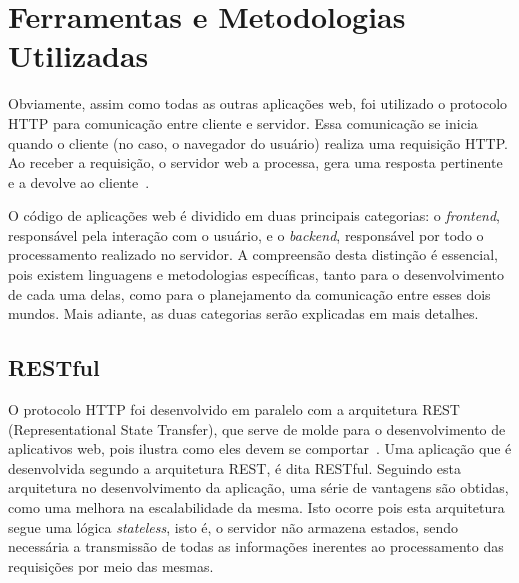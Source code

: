 \chapter{Ferramentas e Metodologias Utilizadas}

Obviamente, assim como todas as outras aplicações web, foi utilizado o protocolo HTTP para comunicação entre cliente e servidor. Essa comunicação se inicia quando o cliente (no caso, o navegador do usuário) realiza uma requisição HTTP. Ao receber a requisição, o servidor web a processa, gera uma resposta pertinente e a devolve ao cliente~\cite{wikipediahttp}.

O código de aplicações web é dividido em duas principais categorias: o \textit{frontend}, responsável pela interação com o usuário, e o \textit{backend}, responsável por todo o processamento realizado no servidor. A compreensão desta distinção é essencial, pois existem linguagens e metodologias específicas, tanto para o desenvolvimento de cada uma delas, como para o planejamento da comunicação entre esses dois mundos. Mais adiante, as duas categorias serão explicadas em mais detalhes.

\section{RESTful}

O protocolo HTTP foi desenvolvido em paralelo com a arquitetura REST (Representational State Transfer),
que serve de molde para o desenvolvimento de aplicativos web, pois ilustra como eles devem se comportar~\cite{restthesis}. Uma aplicação que é desenvolvida segundo a arquitetura REST, é dita RESTful. Seguindo esta arquitetura no desenvolvimento da aplicação, uma série de vantagens são obtidas, como uma melhora na escalabilidade da mesma. Isto ocorre pois esta arquitetura segue uma lógica \textit{stateless}, isto é, o servidor não armazena estados, sendo necessária a transmissão de todas as informações inerentes ao processamento das requisições por meio das mesmas.

